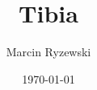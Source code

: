 \documentclass{article}
\begin{document}
\title{Tibia}
\author{Marcin Ryzewski}
\date{\today}
\maketitle  
\end{document}
